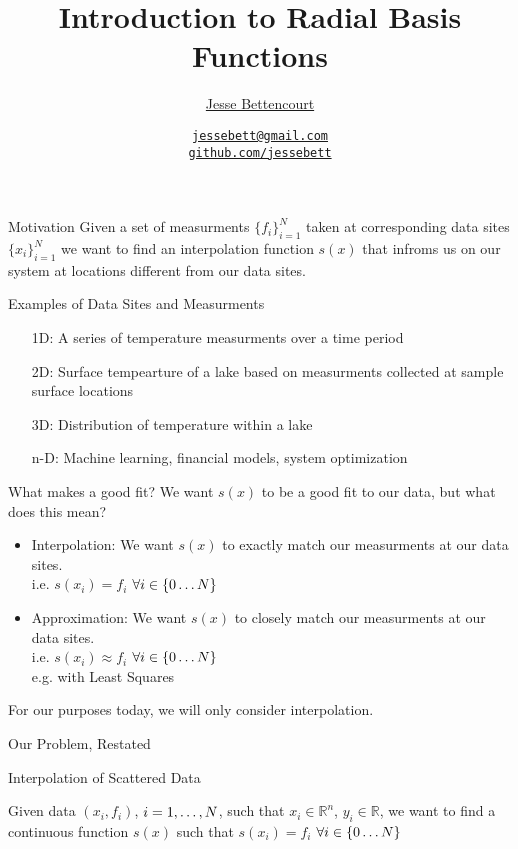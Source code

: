 \documentclass[12pt,t]{beamer}
\title{Introduction to Radial Basis Functions}
\subtitle{}
\author{\href{https://github.com/jessebett/}{Jesse Bettencourt}}
\institute{\href{}{McMaster University}}
\date{\href{jessebett@gmail.com}{\tt \scriptsize jessebett@gmail.com}
\\[-4pt]
\href{http://github.com/jessebett}{\tt \scriptsize github.com/jessebett}
}
\newcommand{\bi}{\begin{itemize}}
\newcommand{\ei}{\end{itemize}}
\newcommand{\subt}[1]{{\footnotesize \color{subtitle} {#1}}}
\begin{document}
{
\frame{
  \titlepage
  \note{}} } 

\begin{frame}{Motivation}
Given a set of measurments \subt{$\{f_i\}_{i=1}^N$}
taken at corresponding data sites \subt{$\{x_i\}_{i=1}^N$}
we want to find an interpolation function \subt{$s(x)$}
that infroms us on our system at locations different from our data sites.\\
\bigskip 

\subt{Examples of Data Sites and Measurments}
\begin{itemize}
\item[1D:] A series of temperature measurments over a time period
\item[2D:] Surface tempearture of a lake based on measurments collected at sample surface locations 
\item[3D:] Distribution of temperature within a lake
\item[n-D:] Machine learning, financial models, system optimization
\end{itemize}

\note{}
\end{frame}

\begin{frame}{What makes a good fit?}
We want $s(x)$ to be a good fit to our data, but what does this mean?
\bi
\item Interpolation: We want $s(x)$ to \subt{exactly match} our measurments at our data sites. \\ 
i.e. $s(x_i)=f_i$ $\forall i\in\{0 \mathellipsis N \}$
\item Approximation: We want $s(x)$ to \subt{closely match} our measurments at our data sites.\\
i.e. $s(x_i)\approx f_i$ $\forall i\in\{0 \mathellipsis N \}$ \\
e.g. with Least Squares 
\ei

For our purposes today, we will only consider interpolation.

\note{}
\end{frame}

\begin{frame}[c]{Our Problem, Restated}

\subt{Interpolation of Scattered Data}

Given data $(x_i,f_i)$, $i=1, \mathellipsis, N$, such that $x_i \in \mathbb{R}^n$, $y_i \in \mathbb{R}$, we want to find a continuous function $s(x)$ such that $s(x_i)=f_i$ $\forall i\in\{0 \mathellipsis N \}$


\note{}
\end{frame}
\end{document}
